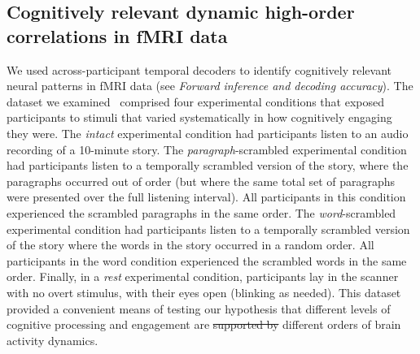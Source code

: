 \documentclass[english]{article}
\providecommand{\DIFaddtex}[1]{{\protect\color{blue}\uwave{#1}}} %
\providecommand{\DIFdeltex}[1]{{\protect\color{red}\sout{#1}}}                      %
\providecommand{\DIFaddbegin}{} %
\providecommand{\DIFaddend}{} %
\providecommand{\DIFdelbegin}{} %
\providecommand{\DIFdelend}{} %
\providecommand{\DIFadd}[1]{\texorpdfstring{\DIFaddtex{#1}}{#1}} %
\providecommand{\DIFdel}[1]{\texorpdfstring{\DIFdeltex{#1}}{}} %
\newcommand{\DIFscaledelfig}{0.5}
\newlength{\DIFdelgraphicswidth} %
\newlength{\DIFdelgraphicsheight} %
\newcommand{\DIFaddincludegraphics}[2][]{{\color{blue}\fbox{\DIFOincludegraphics[#1]{#2}}}} %
\newcommand{\DIFdelincludegraphics}[2][]{%
\sbox{\DIFdelgraphicsbox}{\DIFOincludegraphics[#1]{#2}}%
\settoboxwidth{\DIFdelgraphicswidth}{\DIFdelgraphicsbox} %
\settoboxtotalheight{\DIFdelgraphicsheight}{\DIFdelgraphicsbox} %
\scalebox{\DIFscaledelfig}{%
\parbox[b]{\DIFdelgraphicswidth}{\usebox{\DIFdelgraphicsbox}\\[-\baselineskip] \rule{\DIFdelgraphicswidth}{0em}}\llap{\resizebox{\DIFdelgraphicswidth}{\DIFdelgraphicsheight}{%
\setlength{\unitlength}{\DIFdelgraphicswidth}%
\begin{picture}(1,1)%
\thicklines\linethickness{2pt} %
{\color[rgb]{1,0,0}\put(0,0){\framebox(1,1){}}}%
{\color[rgb]{1,0,0}\put(0,0){\line( 1,1){1}}}%
{\color[rgb]{1,0,0}\put(0,1){\line(1,-1){1}}}%
\end{picture}%
}\hspace*{3pt}}} %
} %
\DeclareRobustCommand{\DIFaddbegin}{\DIFOaddbegin \let\includegraphics\DIFaddincludegraphics} %
\DeclareRobustCommand{\DIFaddend}{\DIFOaddend \let\includegraphics\DIFOincludegraphics} %
\DeclareRobustCommand{\DIFdelbegin}{\DIFOdelbegin \let\includegraphics\DIFdelincludegraphics} %
\DeclareRobustCommand{\DIFdelend}{\DIFOaddend \let\includegraphics\DIFOincludegraphics} %
\begin{document}
\DIFaddend \subsection*{Cognitively relevant dynamic high-order correlations in
  fMRI data}
We used across-participant temporal decoders to identify cognitively
relevant neural patterns in fMRI data (see \textit{Forward inference
  and decoding accuracy}).  The dataset we examined~\citep[collected
by][]{SimoEtal16} comprised four experimental conditions that exposed
participants to stimuli that varied systematically in how cognitively
engaging they were.  The \textit{intact} experimental condition had
participants listen to an audio recording of a 10-minute story.  The
\textit{paragraph}-scrambled experimental condition had participants
listen to a temporally scrambled version of the story, where the
paragraphs occurred out of order (but where the same total set of
paragraphs were presented over the full listening interval).  All
participants in this condition experienced the scrambled paragraphs in
the same order.  The \textit{word}-scrambled experimental condition
had participants listen to a temporally scrambled version of the story
where the words in the story occurred in a random order.  All
participants in the word condition experienced the scrambled words in
the same order.  Finally, in a \textit{rest} experimental condition,
participants lay in the scanner with no overt stimulus, with their
eyes open (blinking as needed).  This dataset provided a convenient
means of testing our hypothesis that different levels of cognitive
processing and engagement are \DIFdelbegin \DIFdel{supported by }\DIFdelend \DIFaddbegin \DIFadd{reflected in }\DIFaddend different orders of brain
activity dynamics.
\end{document}
